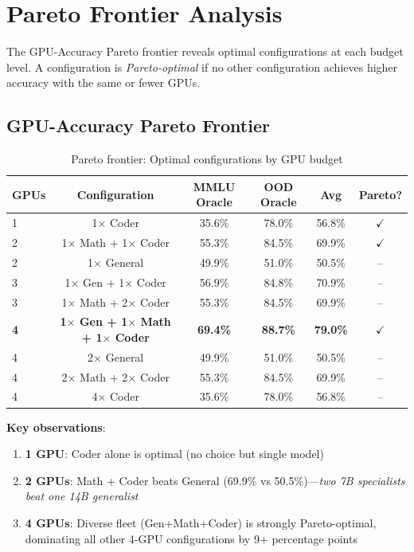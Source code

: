 \documentclass[11pt,a4paper]{article}
\begin{document}
\section{Pareto Frontier Analysis}

The GPU-Accuracy Pareto frontier reveals optimal configurations at each budget level. A configuration is \emph{Pareto-optimal} if no other configuration achieves higher accuracy with the same or fewer GPUs.

\subsection{GPU-Accuracy Pareto Frontier}

\begin{table}[h]
\centering
\caption{Pareto frontier: Optimal configurations by GPU budget}
\label{tab:pareto}
\begin{tabular}{lccccc}
\toprule
\textbf{GPUs} & \textbf{Configuration} & \textbf{MMLU Oracle} & \textbf{OOD Oracle} & \textbf{Avg} & \textbf{Pareto?} \\
\midrule
1 & 1$\times$ Coder & 35.6\% & 78.0\% & 56.8\% & $\checkmark$ \\
2 & 1$\times$ Math + 1$\times$ Coder & 55.3\% & 84.5\% & 69.9\% & $\checkmark$ \\
2 & 1$\times$ General & 49.9\% & 51.0\% & 50.5\% & -- \\
3 & 1$\times$ Gen + 1$\times$ Coder & 56.9\% & 84.8\% & 70.9\% & -- \\
3 & 1$\times$ Math + 2$\times$ Coder & 55.3\% & 84.5\% & 69.9\% & -- \\
\textbf{4} & \textbf{1$\times$ Gen + 1$\times$ Math + 1$\times$ Coder} & \textbf{69.4\%} & \textbf{88.7\%} & \textbf{79.0\%} & $\checkmark$ \\
4 & 2$\times$ General & 49.9\% & 51.0\% & 50.5\% & -- \\
4 & 2$\times$ Math + 2$\times$ Coder & 55.3\% & 84.5\% & 69.9\% & -- \\
4 & 4$\times$ Coder & 35.6\% & 78.0\% & 56.8\% & -- \\
\bottomrule
\end{tabular}
\end{table}

\textbf{Key observations}:
\begin{enumerate}
    \item \textbf{1 GPU}: Coder alone is optimal (no choice but single model)
    \item \textbf{2 GPUs}: Math + Coder beats General (69.9\% vs 50.5\%)---\emph{two 7B specialists beat one 14B generalist}
    \item \textbf{4 GPUs}: Diverse fleet (Gen+Math+Coder) is strongly Pareto-optimal, dominating all other 4-GPU configurations by 9+ percentage points
\end{enumerate}
\end{document}
